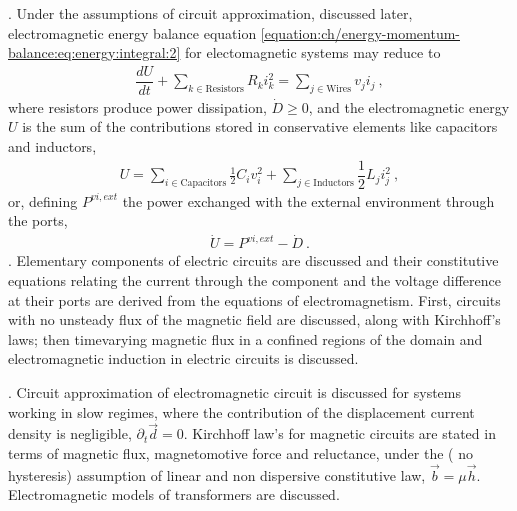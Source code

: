 \documentclass[letterpaper,10pt,english]{jupyterBook}
\begin{document}
\sphinxAtStartPar
{\hyperref[\detokenize{ch/circuits-energy:classical-electromagnetism-circuits-energy}]{}}. Under the assumptions of circuit approximation, discussed later, electromagnetic energy balance equation \eqref{equation:ch/energy-momentum-balance:eq:energy:integral:2} for electomagnetic systems may reduce to
\begin{equation*}
\begin{split}\dfrac{d U}{dt} + \sum_{k \in \text{Resistors}} R_k i_k^2 = \sum_{j \in \text{Wires}} v_j i_j \ ,\end{split}
\end{equation*}
\sphinxAtStartPar
where resistors produce power dissipation, \(\dot{D} \ge 0\), and the electromagnetic energy \(U\) is the sum of the contributions stored in conservative elements like capacitors and inductors,
\begin{equation*}
\begin{split}U = \sum_{i \in \text{Capacitors}} \frac{1}{2} C_i v_i^2 + \sum_{j \in \text{Inductors}} \dfrac{1}{2} L_j i_j^2 \ ,\end{split}
\end{equation*}
\sphinxAtStartPar
or, defining \(P^{vi, ext}\) the power exchanged with the external environment through the ports,
\begin{equation*}
\begin{split}\dot{U} = P^{vi, ext} - \dot{D} \ .\end{split}
\end{equation*}
\sphinxAtStartPar
{\hyperref[\detokenize{ch/circuits-electric:classical-electromagnetism-circuits-electric}]{}}. Elementary components of electric circuits are discussed and their constitutive equations relating the current through the component and the voltage difference at their ports are derived from the equations of electromagnetism. First, circuits with no unsteady flux of the magnetic field are discussed, along with Kirchhoff’s laws; then time\sphinxhyphen{}varying magnetic flux in a confined regions of the domain and electromagnetic induction in electric circuits is discussed.

\sphinxAtStartPar
{\hyperref[\detokenize{ch/circuits-electromagnetic:classical-electromagnetism-circuits-electromagnetic}]{}}. Circuit approximation of electromagnetic circuit is discussed for systems working in slow regimes, where the contribution of the displacement current density is negligible, \(\partial_t \vec{d} = 0\). Kirchhoff law’s for magnetic circuits are stated in terms of magnetic flux, magnetomotive force and reluctance, under the ( no hysteresis) assumption of linear and non dispersive constitutive law, \(\vec{b} = \mu \vec{h}\). Electromagnetic models of transformers are discussed.
\end{document}
